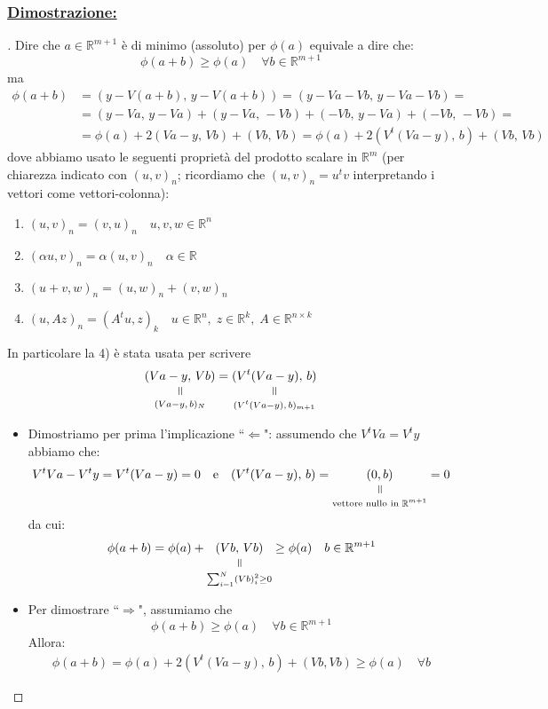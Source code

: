 \documentclass[12pt,a4paper]{article}
\newcommand{\verteq}{\rotatebox{90}{$\,=$}}
\newcommand{\equalto}[2]{\underset{\scriptstyle\overset{\mkern4mu\verteq}{#2}}{#1}}
\begin{document}
\subsubsection{\uline{Dimostrazione:}}
\begin{proof}[\unskip\nopunct]
Dire che $a \in \mathbb{R}^{m+1}$ è di minimo (assoluto) per $\phi(a)$ equivale a dire che:
\[
	\phi(a+b) \geq \phi(a) \quad \forall b \in \mathbb{R}^{m+1}
\]
ma
\[ \begin{split}
\phi(a+b) & = (y-V(a+b),\, y-V(a+b)) = 
 (y-Va-Vb, \, y-Va-Vb) = \\
& = (y-Va,\, y-Va) + (y-Va, \, -Vb) + (-Vb, \, y-Va) + (-Vb, \, -Vb) = \\
& = \phi(a) + 2(Va-y, \, Vb) + (Vb, \, Vb) = \phi(a) +2(V^t(Va-y), \, b) + (Vb, \, Vb)
\end{split} \]
dove abbiamo usato le seguenti proprietà del prodotto scalare in $\mathbb{R}^{m}$ (per chiarezza indicato con $(u,v)_n$; ricordiamo che $(u,v)_n=u^tv$ interpretando i vettori come vettori-colonna):
\begin{enumerate}
\item $(u,v)_n=(v,u)_n \quad u,v,w \in \mathbb{R}^{n}$
\item $(\alpha u,v)_n= \alpha(u,v)_n \quad \alpha \in \mathbb{R}$
\item $(u+v,w)_n=(u,w)_n+(v,w)_n$
\item $(u,Az)_n = (A^tu,z)_k \quad u \in \mathbb{R}^{n}, \; z \in \mathbb{R}^{k}, \; A \in \mathbb{R}^{n \times k}$
\end{enumerate}
In particolare la 4) è stata usata per scrivere
\[
    \equalto{(Va-y, \, Vb)}{(Va-y, \, b)_N} = \equalto{(V^t(Va-y), \, b)}{(V^t(Va-y), \, b)_{m+1}}
\]
\begin{itemize}
\item Dimostriamo per prima l'implicazione ``$\Leftarrow$": assumendo che $V^t Va=V^t y$ abbiamo che:
\[
	V^tVa-V^ty=V^t(Va-y)=0 \quad \text{e} \quad (V^t(Va-y), \, b)=\equalto{(0,b)}{\text{vettore nullo in }\mathbb{R}^{m+1}} =0
\]
da cui:
\[ \begin{split}
	\phi(a+b)=\phi(a)+ \equalto{(Vb,\, Vb)}{\sum_{i=1}^{N}(Vb)_i^2 \geq 0} \geq \phi(a) \quad b \in \mathbb{R}^{m+1}
\end{split} \]
\item Per dimostrare ``$\Rightarrow$", assumiamo che
\[
	\phi(a+b) \geq \phi(a) \quad \forall b \in \mathbb{R}^{m+1}
\]
Allora:
\[ \begin{split}
	\phi(a+b)=\phi(a)+2(V^t(Va-y), \, b)+(Vb,Vb) \geq \phi(a) \quad \forall b

\end{split}\]
\end{itemize}
\end{proof}
\end{document}
